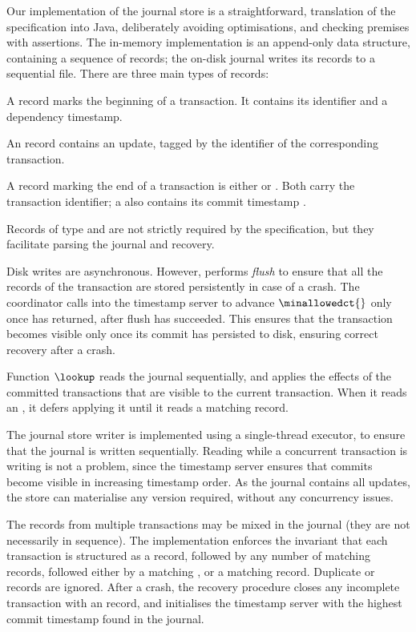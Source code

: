 Our implementation of the journal store is a straightforward,
translation of the specification into Java, deliberately avoiding
optimisations, and checking premises with assertions.
The in-memory implementation is an append-only data structure,
containing a sequence of records; the on-disk journal writes its records
to a sequential file.
There are three main types of records:
\begin{compactitem}
\item
  A \jrnlBeginTag{} record marks the beginning of a
  transaction.
  It contains its identifier and a dependency timestamp.
\item
  An \jrnlUpdateTag{} record contains an update, tagged by the
  identifier of the corresponding transaction.
\item
  A record marking the end of a transaction is either \jrnlAbortTag{}
  or \jrnlCommitTag{}.
  Both carry the transaction identifier; a \jrnlCommitTag{} also
  contains its commit timestamp \acomstp.
\end{compactitem}
Records of type \jrnlBeginTag{} and \jrnlAbortTag{} are not strictly required
by the specification, but they facilitate parsing the journal and
recovery.

Disk writes are asynchronous.
However, \doCommit{} performs \emph{flush} to ensure that all the
records of the transaction are stored persistently in case of a crash.
The coordinator calls into the timestamp server to advance
$\minallowedct{}$ only once \doCommit{} has returned, after flush has
succeeded.
This ensures that the transaction becomes visible only once its commit
has persisted to disk, ensuring correct recovery after a crash.

Function $\lookup$ reads the journal sequentially, and applies the
effects of the committed transactions that are visible to the current
transaction.
When it reads an \jrnlUpdateTag{}, it defers applying it until it
reads a matching \jrnlCommitTag{} record.

The journal store writer is implemented using a single-thread executor,
to ensure that the journal is written sequentially.
Reading while a concurrent transaction is writing is not
a problem, since the timestamp server ensures that commits become visible
in increasing timestamp order.
As the journal contains all updates, the store can materialise any
version required, without any concurrency issues.

The records from multiple transactions may be mixed in the journal (they
are not necessarily in sequence).
The implementation enforces the invariant that each transaction is
structured as a \jrnlBeginTag{} record, followed by any number of
matching \jrnlUpdateTag{} records, followed either by a matching
\jrnlCommitTag{}, or a matching \jrnlAbortTag{} record.
Duplicate \jrnlCommitTag{} or \jrnlAbortTag{} records are ignored.
After a crash, the recovery procedure closes any incomplete transaction
with an \jrnlAbortTag{} record, and initialises the timestamp server with
the highest commit timestamp found in the journal.


